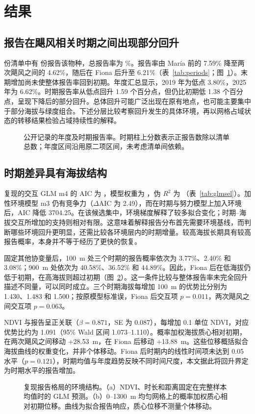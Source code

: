 \section{结果}
\subsection{报告在飓风相关时期之间出现部分回升}
\nChecklists{} 份清单中有 \nDetections{} 份报告该物种，总报告率为 \nEncounterPct{}\%。报告率由 María 前的 7.59\% 降至两次飓风之间的 4.62\%，随后在 Fiona 后升至 6.21\%（表~\ref{tab:periods}；图~\ref{fig:rates}）。末期增加尚未使整体报告率回到初期。年度汇总显示，2019 年为低点 3.80\%，2025 年为 6.62\%。时期报告率从低点回升 1.59 个百分点，但仍比初期低 1.38 个百分点，呈现下降后的部分回升。总体回升可能广泛出现在原有地点，也可能主要集中于部分海拔与绿度组合。下述分层比较考察回升发生的具体环境，再以网格占域状态的转移结果检验占域持续性的解释。
\begin{figure}[htbp]\centering
{}
\caption{公开记录的年度及时期报告率。时期柱上分数表示正报告数除以清单总数；年度区间沿用原二项区间，未考虑清单间依赖。}\label{fig:rates}
\end{figure}



\subsection{时期差异具有海拔结构}
复现的交互 GLM m4 的 AIC 为 \aicMfour{}，模型权重为 \wMfour{}，伪 $R^2$ 为 \pseudoRMfour{}（表~\ref{tab:glmsel}）。加性环境模型 m3 仍有竞争力（$\Delta$AIC 为 2.49），而在时期与努力模型上加入环境后，AIC 降低 3704.25。在该候选集中，环境梯度解释了较多拟合变化；时期--海拔交互所增加的支持则相对有限。这意味着解释报告分布首先需要环境基线，而判断哪些环境回升更明显，还需比较各环境层内的时期增量。较高海拔长期具有较高报告概率，本身并不等于经历了更快的恢复。

固定其他协变量后，100~m 处三个时期的报告概率依次为 3.77\%、2.40\% 和 3.08\%；900~m 处依次为 40.58\%、36.52\% 和 44.89\%。因此，Fiona 后在低海拔仍低于初期，在高海拔则超过初期（图~\ref{fig:gradients}）。这一条件比较与整体报告率未完全回升描述不同量，可以同时成立。三个时期海拔每增加 100~m 的优势比分别为 1.430、1.483 和 1.500；按原模型标准误，Fiona 后交互项 $p=0.011$，两次飓风之间交互项 $p=0.063$。

NDVI 与报告呈正关联（$\beta=0.871$，SE 为 0.087），每增加 0.1 单位 NDVI，对应优势比约为 1.091（95\% Wald 区间 1.073--1.110）。概率加权海拔质心相对初期，在两次飓风之间移动 +28.53~m，在 Fiona 后移动 +13.88~m。这些位移概括拟合海拔曲线的权重变化，并非个体移动。Fiona 后时期内的线性时间项未达到 0.05 水平（$p=0.121$），时期均值与年度趋势反映不同时间尺度，本文据此将回升界定为时期水平的报告增加。
\begin{figure}[htbp]\centering
{}
\caption{复现报告格局的环境结构。（a）NDVI、时长和距离固定在完整样本均值时的 GLM 预测。（b）0--1300~m 均匀网格上的概率加权质心相对初期位移。曲线为拟合报告响应，质心位移不测量个体移动。}\label{fig:gradients}
\end{figure}
\FloatBarrier

